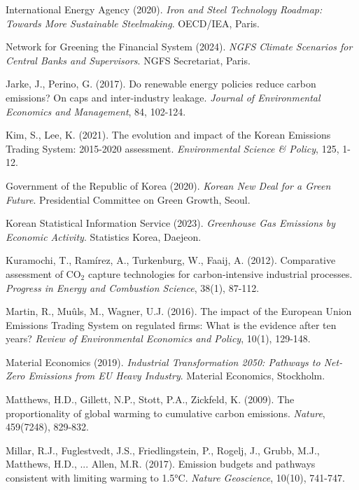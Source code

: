 \documentclass[preprint,1p,authoryear]{elsarticle}
\begin{document}
\begin{thebibliography}{99}
 International Energy Agency (2020). \textit{Iron and Steel Technology Roadmap: Towards More Sustainable Steelmaking}. OECD/IEA, Paris.

 Network for Greening the Financial System (2024). \textit{NGFS Climate Scenarios for Central Banks and Supervisors}. NGFS Secretariat, Paris.

 Jarke, J., Perino, G. (2017). Do renewable energy policies reduce carbon emissions? On caps and inter-industry leakage. \textit{Journal of Environmental Economics and Management}, 84, 102-124.

 Kim, S., Lee, K. (2021). The evolution and impact of the Korean Emissions Trading System: 2015-2020 assessment. \textit{Environmental Science \& Policy}, 125, 1-12.

 Government of the Republic of Korea (2020). \textit{Korean New Deal for a Green Future}. Presidential Committee on Green Growth, Seoul.

 Korean Statistical Information Service (2023). \textit{Greenhouse Gas Emissions by Economic Activity}. Statistics Korea, Daejeon.

 Kuramochi, T., Ramírez, A., Turkenburg, W., Faaij, A. (2012). Comparative assessment of CO$_2$ capture technologies for carbon-intensive industrial processes. \textit{Progress in Energy and Combustion Science}, 38(1), 87-112.

 Martin, R., Muûls, M., Wagner, U.J. (2016). The impact of the European Union Emissions Trading System on regulated firms: What is the evidence after ten years? \textit{Review of Environmental Economics and Policy}, 10(1), 129-148.

 Material Economics (2019). \textit{Industrial Transformation 2050: Pathways to Net-Zero Emissions from EU Heavy Industry}. Material Economics, Stockholm.

 Matthews, H.D., Gillett, N.P., Stott, P.A., Zickfeld, K. (2009). The proportionality of global warming to cumulative carbon emissions. \textit{Nature}, 459(7248), 829-832.

 Millar, R.J., Fuglestvedt, J.S., Friedlingstein, P., Rogelj, J., Grubb, M.J., Matthews, H.D., ... Allen, M.R. (2017). Emission budgets and pathways consistent with limiting warming to 1.5°C. \textit{Nature Geoscience}, 10(10), 741-747.


\end{thebibliography}
\end{document}

